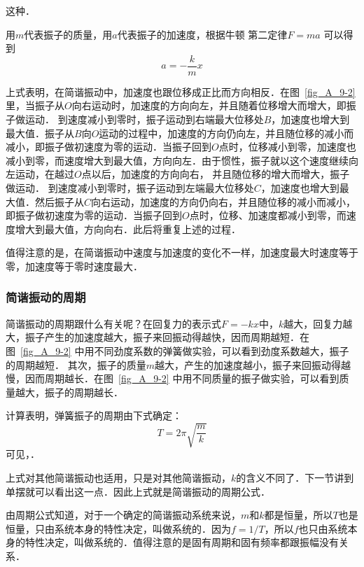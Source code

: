 这种．

用$m$代表振子的质量，用$a$代表振子的加速度，根据牛顿
第二定律$F=ma$ 可以得到
\[a=-\frac{k}{m}x\]

上式表明，在简谐振动中，加速度也跟位移成正比而方向相反．在图~\ref{fig_A_9-2} 里，当振子从$O$向右运动时，加速度的方向向左，并且随着位移增大而增大，即振子做运动．
到速度减小到零时，振子运动到右端最大位移处$B$，加速度也增大到最大值．振子从$B$向$O$运动的过程中，加速度的方向仍向左，并且随位移的减小而减小，即振子做初速度为零的运动．当振子回到$O$点时，位移减小到零，加速度也减小到零，而速度增大到最大值，方向向左．由于惯性，振子就以这个速度继续向左运动，在越过$O$点以后，加速度的方向向右，
并且随位移的增大而增大，振子做运动．
到速度减小到零时，振子运动到左端最大位移处$C$，加速度也增大到最大值．然后振子从$C$向右运动，加速度的方向仍向右，并且随位移的减小而减小，即振子做初速度为零的运动．当振子回到$O$点时，位移、加速度都减小到零，而速度增大到最大值，方向向右．此后将重复上述的过程．

值得注意的是，在简谐振动中速度与加速度的变化不一样，加速度最大时速度等于零，加速度等于零时速度最大．

\subsubsection{简谐振动的周期}

简谐振动的周期跟什么有关呢？在回复力的表示式$F=-kx$中，$k$越大，回复力越大，振子产生的加速度越大，振子来回振动得越快，因而周期越短．在图~\ref{fig_A_9-2} 中用不同劲度系数的弹簧做实验，可以看到劲度系数越大，振子的周期越短．
其次，振子的质量$m$越大，产生的加速度越小，振子来回振动得越慢，因而周期越长．在图~\ref{fig_A_9-2} 中用不同质量的振子做实验，可以看到质量越大，振子的周期越长．

计算表明，弹簧振子的周期由下式确定：
\[T=2\pi\sqrt{\frac{m}{k}} \]
可见，．

上式对其他简谐振动也适用，只是对其他简谐振动，$k$的含义不同了．下一节讲到单摆就可以看出这一点．因此上式就是简谐振动的周期公式．

由周期公式知道，对于一个确定的简谐振动系统来说，$m$和$k$都是恒量，所以$T$也是恒量，只由系统本身的特性决定，叫做系统的．因为$f=1/T$，所以$f$也只由系统本身的特性决定，叫做系统的．值得注意的是固有周期和固有频率都跟振幅没有关系．
	
